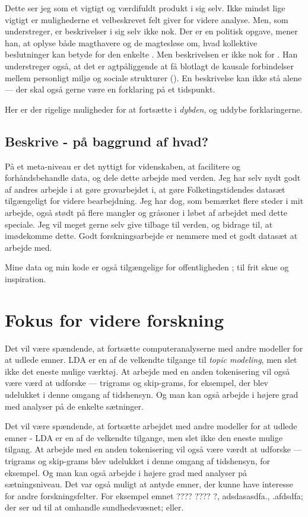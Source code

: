 Dette ser jeg som et vigtigt og værdifuldt produkt i sig selv.
Ikke mindst lige vigtigt er mulighederne et velbeskrevet felt giver for videre analyse.
Men, som \citeauthor{millsSociologicalImagination2000} understreger, er beskrivelser i sig selv ikke nok.
Der er en politisk opgave, mener han, at oplyse både magthavere og de magtesløse om, hvad kollektive beslutninger kan betyde for den enkelte \autocite[s. ]{millsSociologicalImagination2000}.
Men beskrivelsen er ikke nok for \citeauthor{millsSociologicalImagination2000}.
Han understreger også, at det er agtpåliggende at få blotlagt de kausale forbindelser mellem personligt miljø og sociale strukturer (\citeyear[s. 130]{millsSociologicalImagination2000}).
En beskrivelse kan ikke stå alene — der skal også gerne være en forklaring på et tidspunkt.

Her er der rigelige muligheder for at fortsætte i \textit{dybden}, og uddybe forklaringerne.

\section{Beskrive - på baggrund af hvad?}

På et meta-niveau er det nyttigt for videnskaben,
at facilitere og forhåndsbehandle data,
og dele dette arbejde med verden.
Jeg har selv nydt godt af andres arbejde i at gøre grovarbejdet i,
at gøre Folketingstidendes datasæt tilgængeligt for videre bearbejdning.
Jeg har dog, som bemærket flere steder i mit arbejde, 
også stødt på flere mangler og gråsoner i løbet af arbejdet med dette speciale.
Jeg vil meget gerne selv give tilbage til verden, og bidrage til, at imødekomme dette.
Godt forskningsarbejde er nemmere med et godt datasæt at arbejde med.

Mine data og min kode er også tilgængelige for offentligheden \autocite{andersenNorseghostMasterthesis2020}; til frit skue og inspiration.

\chapter{Fokus for videre forskning}

Det vil være spændende, at fortsætte computeranalyserne med andre modeller for at udlede emner.
LDA er en af de velkendte tilgange til \textit{topic modeling}, men slet ikke det eneste mulige værktøj.
At arbejde med en anden tokenisering vil også være værd at udforske — 
trigrams og skip-grams, for eksempel, der blev udelukket i denne omgang af tidshensyn.
Og man kan også arbejde i højere grad med analyser på de enkelte sætninger.

Det vil være spændende, at fortsætte arbejdet med andre modeller for at udlede emner - LDA er en af de velkendte tilgange, men slet ikke den eneste mulige tilgang.
At arbejde med en anden tokenisering vil også være værdt at udforske — trigrams og skip-grams blev udelukket i denne omgang af tidshensyn, for eksempel. Og man kan også arbejde i højere grad med analyser på sætningsniveau.
Det var også muligt at antyde emner, der kunne have interesse for andre forskningsfelter.
For eksempel emnet ???? ???? ?, adsdasasdfa., .afdsdfa; der ser ud til at omhandle sundhedsvæsnet; eller.
